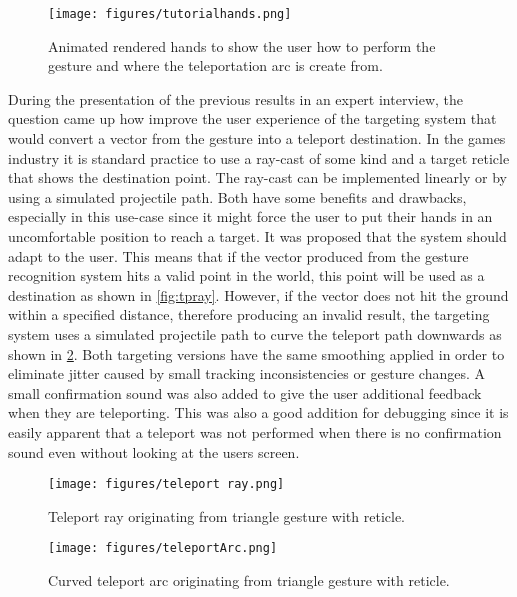 \begin{figure}[!ht]
    \centering
    \texttt{[image: figures/tutorialhands.png]}
    \caption{Animated rendered hands to show the user how to perform the gesture and where the teleportation arc is create from.}
    \label{fig:tutorial}
\end{figure}

During the presentation of the previous results in an expert interview, the question came up how improve the user experience of the targeting system that would convert a vector from the gesture into a teleport destination. In the games industry it is standard practice to use a ray-cast of some kind and a target reticle that shows the destination point. The ray-cast can be implemented linearly or by using a simulated projectile path. Both have some benefits and drawbacks, especially in this use-case since it might force the user to put their hands in an uncomfortable position to reach a target. It was proposed that the system should adapt to the user. This means that if the vector produced from the gesture recognition system hits a valid point in the world, this point will be used as a destination as shown in \ref{fig:tpray}. However, if the vector does not hit the ground within a specified distance, therefore producing an invalid result, the targeting system uses a simulated projectile path to curve the teleport path downwards as shown in \ref{fig:tparc}. Both targeting versions have the same smoothing applied in order to eliminate jitter caused by small tracking inconsistencies or gesture changes. A small confirmation sound was also added to give the user additional feedback when they are teleporting. This was also a good addition for debugging since it is easily apparent that a teleport was not performed when there is no confirmation sound even without looking at the users screen.

\begin{figure}[!htb]
        \texttt{[image: figures/teleport ray.png]}
        \caption{Teleport ray originating from triangle gesture with reticle.}
        \label{fig:tpray}
    \endminipage\hfill
        \texttt{[image: figures/teleportArc.png]}
        \caption{Curved teleport arc originating from triangle gesture with reticle.}
        \label{fig:tparc}
    \endminipage\hfill
\end{figure}